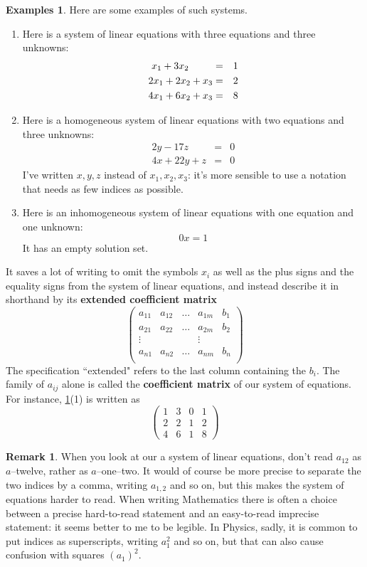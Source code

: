 \documentclass[11pt]{amsbook}
\theoremstyle{definition}
\newtheorem{rem}[theorem]{Remark}
\newtheorem{exas}[theorem]{Examples}
\begin{document}
\begin{exas} \label{exsla} Here are some examples of such systems.
\begin{enumerate}
\item Here is a system of linear equations with three equations and three unknowns:
\begin{eqnarray*}
x_1 + 3x_2 \hspace{8.5mm} & = & 1\\
2x_1 + 2x_2 + x_3 & = & 2 \\
4x_1 + 6x_2 + x_3 & = & 8
\end{eqnarray*}
\item Here is a homogeneous system of linear equations with two equations and three unknowns:
\begin{eqnarray*}
2y - 17z & = & 0 \\
4x + 22y +z & = & 0
\end{eqnarray*}
I've written $x,y,z$ instead of $x_1, x_2, x_3$: it's more sensible to use a notation that needs as few indices as possible.
\item Here is an inhomogeneous system of linear equations with one equation and one unknown:
$$ 0x = 1 $$  It has an empty solution set.
\end{enumerate}
\end{exas}

It saves a lot of writing to omit the symbols $x_i$ as well as the plus signs and the equality signs from the system of linear equations, and instead describe it in shorthand by its {\bf extended coefficient matrix}
$$
\left(
\begin{array}{cccc|c}
a_{11} & a_{12} & \ldots & a_{1m} & b_1 \\
a_ {21} & a_{22} & \ldots & a_{2m} & b_2 \\
\vdots & & & \vdots & \\
a_{n1} & a_{n2} & \ldots & a_{nm} & b_n \\
\end{array}
\right)
$$
The specification ``extended" refers to the last column containing the $b_i$. The family of $a_{ij}$ alone is called the {\bf coefficient matrix} of our system of equations. For instance, \ref{exsla}(1) is written as $$\left( \begin{array}{ccc|c} 1&3&0&1 \\ 2&2&1&2 \\ 4&6&1&8\end{array} \right)$$

\begin{rem} When you look at our a system of linear equations, don't read $a_{12}$ as $a$--twelve, rather as $a$--one--two. It would of course be more precise to separate the two indices by a comma, writing $a_{1,2}$ and so on, but this makes the system of equations harder to read. When writing Mathematics there is often a choice between a precise hard-to-read statement and an easy-to-read imprecise statement: it seems better to me to be legible. In Physics, sadly, it is common to put indices as superscripts, writing $a^2_1$ and so on, but that can also cause confusion with squares $(a_1)^2$.
\end{rem}
\end{document}
